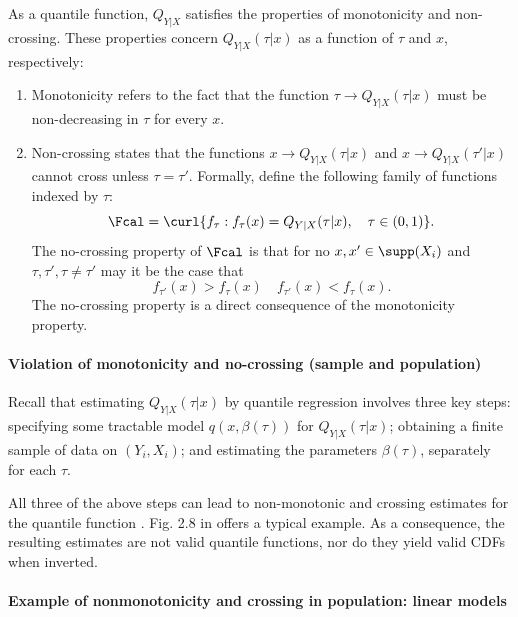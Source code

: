  As a quantile function, $Q_{Y|X}$ satisfies the properties of  monotonicity and non-crossing. These properties concern $Q_{Y|X}(\tau|x)$ as a function of $\tau$ and $x$, respectively:
 \begin{enumerate}
 	\item Monotonicity refers to the fact that the function $\tau\to Q_{Y|X}(\tau|x)$ must be non-decreasing in $\tau$ for every $x$.
 	
 	\item Non-crossing states that the functions  $x \to Q_{Y|X}(\tau|x)$ and $x\to Q_{Y|X}(\tau'|x)$ cannot cross unless $\tau=\tau'$. 
 	Formally, define the following family of functions indexed by $\tau$:
 	 \begin{equation}
 		\Fcal= 	\curl{ f_{\tau}: f_{\tau}(x)= Q_{Y|X}(\tau|x), \quad \tau\in (0, 1)}.
 	\end{equation} 
 The no-crossing property of $\Fcal$ is that  for no $x, x'\in \supp(X_i)$ and $\tau, \tau', \tau\neq\tau'$ may it be the case that 
 	\begin{equation}
 		f_{\tau'}(x)>f_{\tau}(x)  \quad f_{\tau'}(x)< f_{\tau}(x).
 	\end{equation}
 	The no-crossing property is a direct consequence of the monotonicity property.
 \end{enumerate}

\paragraph{Violation of monotonicity and no-crossing (sample and population)}
 
 Recall that  estimating $Q_{Y|X}(\tau|x)$ by quantile regression involves three key steps: specifying some  tractable model $q(x, \beta(\tau))$ for $Q_{Y|X}(\tau|x)$; obtaining  a finite sample of data on $(Y_i, X_i)$; and estimating the parameters $\beta(\tau)$, separately for each $\tau$.
 
All three of the above steps can lead to non-monotonic and crossing estimates for the quantile function \citep{Bassett1982EmpiricalQuantileFunction}. Fig. 2.8 in \cite{Koenker2005} offers a typical example. As a consequence, the resulting estimates are not valid quantile functions, nor do they yield valid CDFs when inverted. 


 

  
\paragraph{Example of nonmonotonicity and crossing in population: linear models}
   

